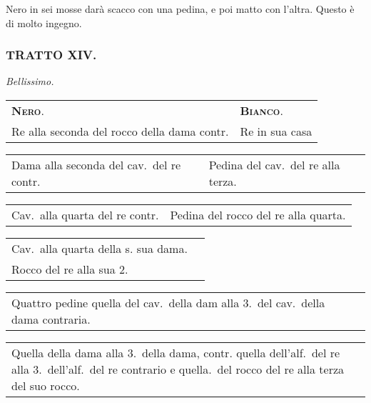 \documentclass[11pt,a6paper]{article}
\begin{document}
Nero in sei mosse darà scacco con una pedina, e
poi matto con l'altra. Questo è di molto ingegno.


\subsubsection{TRATTO XIV.}

\hfill\textit{\footnotesize Bellissimo.}

{\small
 \noindent\begin{tabular}{@{}p{3.84cm}p{3.84cm}}
 {\bfseries\scshape Nero}. & {\bfseries\scshape Bianco}.\\
Re alla seconda del rocco della dama contr.& Re in sua casa\\
\end{tabular}

\noindent\begin{tabular}{@{}p{3.84cm}p{3.84cm}}
Dama alla seconda del cav.\ del re contr.& Pedina del cav.\ del re alla terza.\\
\end{tabular}

\noindent\begin{tabular}{@{}p{3.84cm}p{3.84cm}}
Cav.\ alla quarta del re contr.& Pedina del rocco del re alla quarta.\\
\end{tabular}

\noindent\begin{tabular}{@{}p{3.84cm}p{3.84cm}}
Cav.\ alla quarta della s. sua dama. &\\
Rocco del re alla sua 2. &\\
\end{tabular}

\noindent\begin{tabular}{@{}p{3.84cm}p{3.84cm}}
Quattro pedine quella del cav.\ della dam alla 3.\ del cav.\ della dama contraria.\\
\end{tabular}

\noindent\begin{tabular}{@{}p{3.84cm}p{3.84cm}}
Quella della dama alla 3.\ della dama,
contr. quella dell'alf.\ del re
alla 3.\ dell'alf.\ del re contrario e
quella.\ del rocco del re alla
terza del suo rocco.

 \end{tabular}
}
\end{document}
